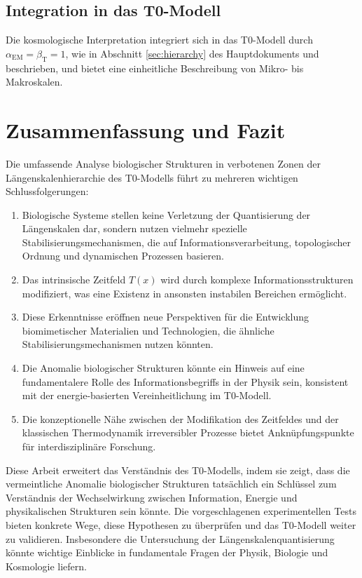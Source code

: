 \documentclass[12pt,a4paper]{article}
\newcommand{\Tfield}{T(x)}
\newcommand{\alphaEM}{\alpha_{\text{EM}}}
\newcommand{\betaT}{\beta_{\text{T}}}
\begin{document}
	\subsection{Integration in das T0-Modell}
	\label{subsec:integration_t0}
	
	Die kosmologische Interpretation integriert sich in das T0-Modell durch \(\alphaEM = \betaT = 1\), wie in Abschnitt \ref{sec:hierarchy} des Hauptdokuments und \cite{pascher_alpha_beta_2025} beschrieben, und bietet eine einheitliche Beschreibung von Mikro- bis Makroskalen.
	
	\section{Zusammenfassung und Fazit}
	\label{sec:fazit}
	
	Die umfassende Analyse biologischer Strukturen in verbotenen Zonen der Längenskalenhierarchie des T0-Modells führt zu mehreren wichtigen Schlussfolgerungen:
	
	\begin{enumerate}
		\item Biologische Systeme stellen keine Verletzung der Quantisierung der Längenskalen dar, sondern nutzen vielmehr spezielle Stabilisierungsmechanismen, die auf Informationsverarbeitung, topologischer Ordnung und dynamischen Prozessen basieren.
		\item Das intrinsische Zeitfeld \(\Tfield\) wird durch komplexe Informationsstrukturen modifiziert, was eine Existenz in ansonsten instabilen Bereichen ermöglicht.
		\item Diese Erkenntnisse eröffnen neue Perspektiven für die Entwicklung biomimetischer Materialien und Technologien, die ähnliche Stabilisierungsmechanismen nutzen könnten.
		\item Die Anomalie biologischer Strukturen könnte ein Hinweis auf eine fundamentalere Rolle des Informationsbegriffs in der Physik sein, konsistent mit der energie-basierten Vereinheitlichung im T0-Modell.
		\item Die konzeptionelle Nähe zwischen der Modifikation des Zeitfeldes und der klassischen Thermodynamik irreversibler Prozesse bietet Anknüpfungspunkte für interdisziplinäre Forschung.
	\end{enumerate}
	
	Diese Arbeit erweitert das Verständnis des T0-Modells, indem sie zeigt, dass die vermeintliche Anomalie biologischer Strukturen tatsächlich ein Schlüssel zum Verständnis der Wechselwirkung zwischen Information, Energie und physikalischen Strukturen sein könnte. Die vorgeschlagenen experimentellen Tests bieten konkrete Wege, diese Hypothesen zu überprüfen und das T0-Modell weiter zu validieren. Insbesondere die Untersuchung der Längenskalenquantisierung könnte wichtige Einblicke in fundamentale Fragen der Physik, Biologie und Kosmologie liefern.
	
\end{document}
